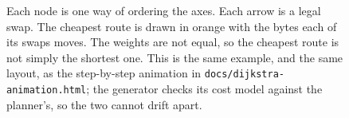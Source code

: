 %
%
\begin{figure}[!t]
\centering
%
\caption{
Each node is one way of ordering the axes. Each arrow is a legal swap. The
cheapest route is drawn in orange with the bytes each of its swaps moves. The
weights are not equal, so the cheapest route is not simply the shortest one.
This is the same example, and the same layout, as the step-by-step animation in
\texttt{docs/dijkstra-animation.html}; the generator checks its cost model
against the planner's, so the two cannot drift apart.}
\label{fig:graph}
\end{figure}

